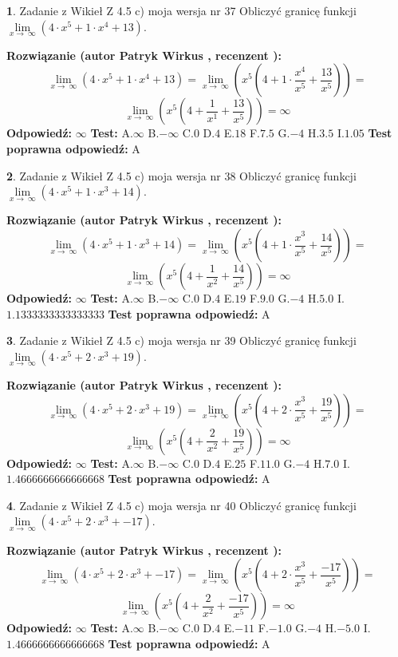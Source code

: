 \documentclass[12pt, a4paper]{article}
\theoremstyle{definition} %
\newtheorem{zad}{}
\newcommand{\zadStart}[1]{\begin{zad}#1\newline}
\newcommand{\zadStop}{\end{zad}}
\newcommand{\rozwStart}[2]{\noindent \textbf{Rozwiązanie (autor #1 , recenzent #2): }\newline}
\newcommand{\rozwStop}{\newline}
\newcommand{\odpStart}{\noindent \textbf{Odpowiedź:}\newline}
\newcommand{\odpStop}{\newline}
\newcommand{\testStart}{\noindent \textbf{Test:}\newline}
\newcommand{\testStop}{\newline}
\newcommand{\kluczStart}{\noindent \textbf{Test poprawna odpowiedź:}\newline}
\newcommand{\kluczStop}{\newline}
\begin{document}
\zadStart{Zadanie z Wikieł Z 4.5 c) moja wersja nr 37}
Obliczyć granicę funkcji  $\lim\limits_{x\to\ \infty}(4 \cdot x^{5}+1 \cdot x^{4}+13)$.
\zadStop
\rozwStart{Patryk Wirkus}{}
$$\lim\limits_{x\to\ \infty}(4 \cdot x^{5}+1 \cdot x^{4}+13) = \lim\limits_{x\to\ \infty}(x^{5}(4 +1 \cdot \frac{x^{4}}{x^{5}}+\frac{13}{x^{5}})) =$$ $$\lim\limits_{x\to\ \infty}(x^{5}(4 +\frac{1}{x^{1}}+\frac{13}{x^{5}})) =\infty$$
\rozwStop
\odpStart
$\infty$
\odpStop
\testStart
A.$\infty$ B.$-\infty$ C.$0$ D.$4$ E.$18$
F.$7.5$ G.$-4$
H.$3.5$
I.$1.05$
\testStop
\kluczStart
A
\kluczStop



\zadStart{Zadanie z Wikieł Z 4.5 c) moja wersja nr 38}
Obliczyć granicę funkcji  $\lim\limits_{x\to\ \infty}(4 \cdot x^{5}+1 \cdot x^{3}+14)$.
\zadStop
\rozwStart{Patryk Wirkus}{}
$$\lim\limits_{x\to\ \infty}(4 \cdot x^{5}+1 \cdot x^{3}+14) = \lim\limits_{x\to\ \infty}(x^{5}(4 +1 \cdot \frac{x^{3}}{x^{5}}+\frac{14}{x^{5}})) =$$ $$\lim\limits_{x\to\ \infty}(x^{5}(4 +\frac{1}{x^{2}}+\frac{14}{x^{5}})) =\infty$$
\rozwStop
\odpStart
$\infty$
\odpStop
\testStart
A.$\infty$ B.$-\infty$ C.$0$ D.$4$ E.$19$
F.$9.0$ G.$-4$
H.$5.0$
I.$1.1333333333333333$
\testStop
\kluczStart
A
\kluczStop



\zadStart{Zadanie z Wikieł Z 4.5 c) moja wersja nr 39}
Obliczyć granicę funkcji  $\lim\limits_{x\to\ \infty}(4 \cdot x^{5}+2 \cdot x^{3}+19)$.
\zadStop
\rozwStart{Patryk Wirkus}{}
$$\lim\limits_{x\to\ \infty}(4 \cdot x^{5}+2 \cdot x^{3}+19) = \lim\limits_{x\to\ \infty}(x^{5}(4 +2 \cdot \frac{x^{3}}{x^{5}}+\frac{19}{x^{5}})) =$$ $$\lim\limits_{x\to\ \infty}(x^{5}(4 +\frac{2}{x^{2}}+\frac{19}{x^{5}})) =\infty$$
\rozwStop
\odpStart
$\infty$
\odpStop
\testStart
A.$\infty$ B.$-\infty$ C.$0$ D.$4$ E.$25$
F.$11.0$ G.$-4$
H.$7.0$
I.$1.4666666666666668$
\testStop
\kluczStart
A
\kluczStop



\zadStart{Zadanie z Wikieł Z 4.5 c) moja wersja nr 40}
Obliczyć granicę funkcji  $\lim\limits_{x\to\ \infty}(4 \cdot x^{5}+2 \cdot x^{3}+-17)$.
\zadStop
\rozwStart{Patryk Wirkus}{}
$$\lim\limits_{x\to\ \infty}(4 \cdot x^{5}+2 \cdot x^{3}+-17) = \lim\limits_{x\to\ \infty}(x^{5}(4 +2 \cdot \frac{x^{3}}{x^{5}}+\frac{-17}{x^{5}})) =$$ $$\lim\limits_{x\to\ \infty}(x^{5}(4 +\frac{2}{x^{2}}+\frac{-17}{x^{5}})) =\infty$$
\rozwStop
\odpStart
$\infty$
\odpStop
\testStart
A.$\infty$ B.$-\infty$ C.$0$ D.$4$ E.$-11$
F.$-1.0$ G.$-4$
H.$-5.0$
I.$1.4666666666666668$
\testStop
\kluczStart
A
\kluczStop
\end{document}
